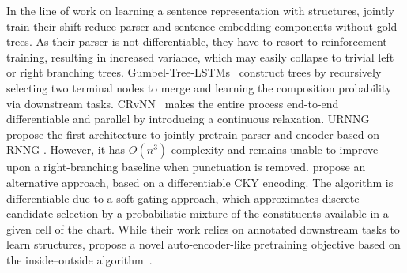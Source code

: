 In the line of work on learning a sentence representation with structures,  jointly train their shift-reduce parser and sentence embedding components without gold trees.
As their parser is not differentiable, they have to resort to reinforcement training, resulting in increased variance, which may easily collapse to trivial left or right branching trees. Gumbel-Tree-LSTMs~\cite{DBLP:conf/aaai/ChoiYL18} construct trees by recursively selecting two terminal nodes to merge and learning the composition probability via downstream tasks. CRvNN~\cite{DBLP:conf/icml/ChowdhuryC21} makes the entire process end-to-end differentiable and parallel by introducing a continuous relaxation.
URNNG~\cite{dblp:conf/naacl/kimrykdm19} propose the first architecture to jointly pretrain parser and encoder based on RNNG \cite{dyer-etal-2016-recurrent}. However, it has $O(n^3)$ complexity and remains unable to improve upon a right-branching baseline when punctuation is removed.
 propose an alternative approach, based on a differentiable CKY encoding. The algorithm is differentiable due to a soft-gating approach, which approximates discrete candidate selection by a probabilistic mixture of the constituents available in a given cell of the chart. While their work relies on annotated downstream tasks to learn structures,  propose a novel auto-encoder-like pretraining objective based on the inside--outside algorithm~\cite{Baker1979TrainableGF,DBLP:conf/icgi/Casacuberta94}. 
